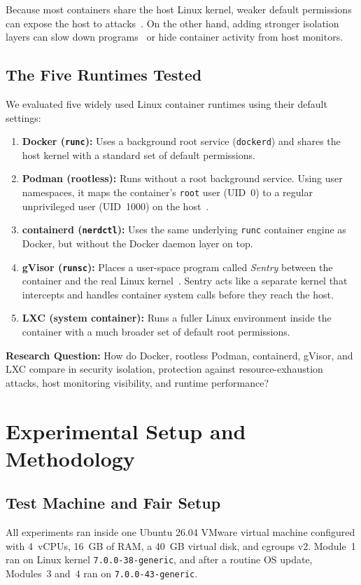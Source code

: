 \documentclass[conference]{IEEEtran}
\begin{document}
Because most containers share the host Linux kernel, weaker default permissions can expose the host to attacks~\cite{lin2018}. On the other hand, adding stronger isolation layers can slow down programs~\cite{young2019} or hide container activity from host monitors.

\subsection{The Five Runtimes Tested}
We evaluated five widely used Linux container runtimes using their default settings:
\begin{enumerate}
    \item \textbf{Docker (\texttt{runc}):} Uses a background root service (\texttt{dockerd}) and shares the host kernel with a standard set of default permissions.
    \item \textbf{Podman (rootless):} Runs without a root background service. Using user namespaces, it maps the container's \texttt{root} user (UID~0) to a regular unprivileged user (UID~1000) on the host~\cite{podman}.
    \item \textbf{containerd (\texttt{nerdctl}):} Uses the same underlying \texttt{runc} container engine as Docker, but without the Docker daemon layer on top.
    \item \textbf{gVisor (\texttt{runsc}):} Places a user-space program called \textit{Sentry} between the container and the real Linux kernel~\cite{gvisor}. Sentry acts like a separate kernel that intercepts and handles container system calls before they reach the host.
    \item \textbf{LXC (system container):} Runs a fuller Linux environment inside the container with a much broader set of default root permissions.
\end{enumerate}

\textbf{Research Question:} How do Docker, rootless Podman, containerd, gVisor, and LXC compare in security isolation, protection against resource-exhaustion attacks, host monitoring visibility, and runtime performance?

\section{Experimental Setup and Methodology}

\subsection{Test Machine and Fair Setup}
All experiments ran inside one Ubuntu 26.04 VMware virtual machine configured with 4~vCPUs, 16~GB of RAM, a 40~GB virtual disk, and cgroups v2. Module~1 ran on Linux kernel \texttt{7.0.0-38-generic}, and after a routine OS update, Modules~3 and~4 ran on \texttt{7.0.0-43-generic}.
\end{document}
